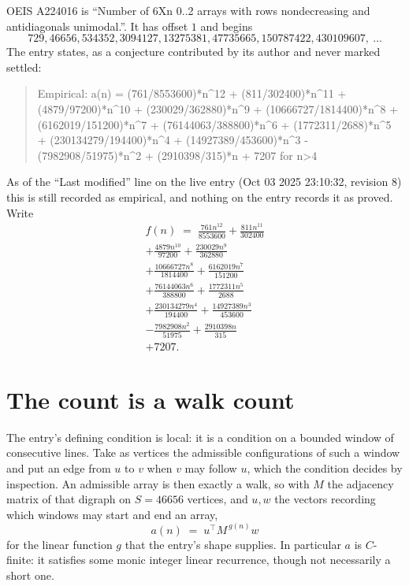 \documentclass[11pt,a4paper]{article}
\theoremstyle{plain}
\theoremstyle{definition}
\begin{document}
OEIS A224016 is ``Number of 6Xn 0..2 arrays with rows nondecreasing and antidiagonals unimodal.''. It has offset $1$ and begins
\[
729, 46656, 534352, 3094127, 13275381, 47735665, 150787422, 430109607,\ \dots
\]
The entry states, as a conjecture contributed by its author and never marked settled:
\begin{quote}
Empirical: a(n) = (761/8553600)*n\^{}12 + (811/302400)*n\^{}11 + (4879/97200)*n\^{}10 + (230029/362880)*n\^{}9 + (10666727/1814400)*n\^{}8 + (6162019/151200)*n\^{}7 + (76144063/388800)*n\^{}6 + (1772311/2688)*n\^{}5 + (230134279/194400)*n\^{}4 + (14927389/453600)*n\^{}3 - (7982908/51975)*n\^{}2 + (2910398/315)*n + 7207 for n>4
\end{quote}
As of the ``Last modified'' line on the live entry (Oct 03 2025 23:10:32, revision 8) this is still
recorded as empirical, and nothing on the entry records it as proved. Write
\begin{multline*}
f(n)\;=\;\frac{761 n^{12}}{8553600} + \frac{811 n^{11}}{302400} \\
+ \frac{4879 n^{10}}{97200} + \frac{230029 n^{9}}{362880} \\
+ \frac{10666727 n^{8}}{1814400} + \frac{6162019 n^{7}}{151200} \\
+ \frac{76144063 n^{6}}{388800} + \frac{1772311 n^{5}}{2688} \\
+ \frac{230134279 n^{4}}{194400} + \frac{14927389 n^{3}}{453600} \\
- \frac{7982908 n^{2}}{51975} + \frac{2910398 n}{315} \\
+ 7207.
\end{multline*}

\section{The count is a walk count}

The entry's defining condition is local: it is a condition on a bounded window of consecutive lines. Take as vertices the
admissible configurations of such a window and put an edge from $u$ to $v$ when $v$ may
follow $u$, which the condition decides by inspection. An admissible array is then exactly a
walk, so with $M$ the adjacency matrix of that digraph on $S=46656$ vertices, and $u,w$ the
vectors recording which windows may start and end an array,
\[
a(n)\;=\;u^{\!\top}M^{\,g(n)}w
\]
for the linear function $g$ that the entry's shape supplies. In particular $a$ is
$C$-finite: it satisfies some monic integer linear recurrence, though not necessarily a short
one.
\end{document}
